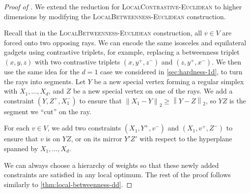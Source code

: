 \documentclass{article}
\theoremstyle{definition}  %
\theoremstyle{plain}
\numberwithin{observation}{section}
\numberwithin{claim}{section}
\numberwithin{fact}{section}
\numberwithin{lemma}{section}
\numberwithin{proposition}{section}
\numberwithin{theorem}{section}
\numberwithin{corollary}{section}
\numberwithin{definition}{section}
\newcommand{\norm}[1]{\left\| #1 \right\|}
\theoremstyle{plain}
\begin{document}
\begin{proof}[Proof of ]
We extend the reduction for \textsc{LocalContrastive-Euclidean} to higher dimensions by modifying the \textsc{LocalBetweenness-Euclidean} construction.

Recall that in the \textsc{LocalBetweenness-Euclidean} construction, all $v \in V$ are forced onto two opposing rays. We can encode the same isosceles and equilateral gadgets using contrastive triplets, for example, replacing a betweenness triplet $(x,y,z)$ with two contrastive triplets $(x,y^+,z^-)$ and $(z,y^+,x^-)$. We then use the same idea for the $d=1$ case we considered in \cref{sec:hardness-1d}, to turn the rays into segments. Let $Y$ be a new special vertex forming a regular simplex with $X_1, \dots, X_d$, and $Z$ be a new special vertex on one of the rays. We add a constraint $(Y, Z^+, X_1^-)$ to ensure that $\norm{X_1 - Y}_2 \geq \norm{Y - Z}_2$, so $YZ$ is the segment we ``cut'' on the ray.

For each $v \in V$, we add two constraints $(X_1, Y^+, v^-)$ and $(X_1, v^+, Z^-)$ to ensure that $v$ is on $YZ$, or on its mirror $Y'Z'$ with respect to the hyperplane spanned by $X_1,\dots,X_d$.

We can always choose a hierarchy of weights so that these newly added constraints are satisfied in any local optimum. The rest of the proof follows similarly to \cref{thm:local-betweenness-dd}.
\end{proof}
\end{document}
